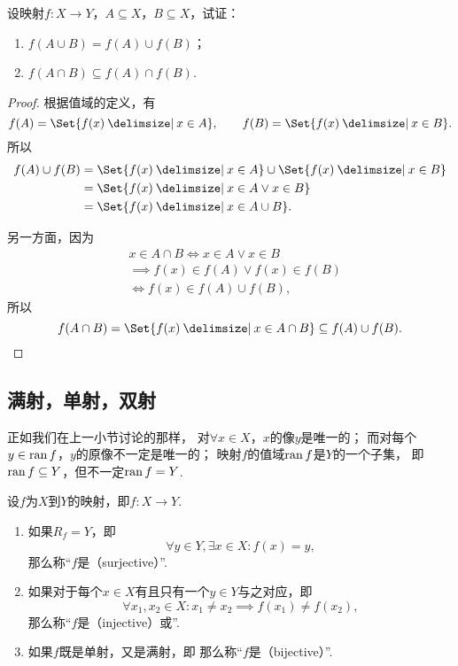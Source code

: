 \begin{example}
设映射\(f\colon X \to Y\)，\(A \subseteq X\)，\(B \subseteq X\)，试证：\begin{enumerate}
	\item \(f(A \cup B) = f(A) \cup f(B)\)；
	\item \(f(A \cap B) \subseteq f(A) \cap f(B)\).
\end{enumerate}
\begin{proof}
\def\fran#1{ \Set{ f(x) \given #1 } }
根据值域的定义，有\[
	f(A) = \fran{x \in A},
	\qquad
	f(B) = \fran{x \in B}.
\]所以\[
	\begin{split}
		f(A) \cup f(B)
		&= \fran{x \in A} \cup \fran{x \in B} \\
		&= \fran{x \in A \lor x \in B} \\
		&= \fran{x \in A \cup B}.
	\end{split}
\]

另一方面，因为\[
	\begin{split}
		&x \in A \cap B
		\iff
		x \in A \lor x \in B \\
		&\implies
		f(x) \in f(A) \lor f(x) \in f(B) \\
		&\iff
		f(x) \in f(A) \cup f(B),
	\end{split}
\]所以\[
	f(A \cap B) = \fran{x \in A \cap B}
	\subseteq f(A) \cup f(B).
	\qedhere
\]
\end{proof}
\end{example}

\subsection{满射，单射，双射}
正如我们在上一小节讨论的那样，
对\(\forall x \in X\)，\(x\)的像\(y\)是唯一的；
而对每个\(y \in \operatorname{ran} f\)，\(y\)的原像不一定是唯一的；
映射\(f\)的值域\(\operatorname{ran} f\)是\(Y\)的一个子集，
即\(\operatorname{ran} f \subseteq Y\)，但不一定\(\operatorname{ran} f = Y\).

\begin{definition}
	设\(f\)为\(X\)到\(Y\)的映射，即\(f\colon X \to Y\).
	\begin{enumerate}
		\item 如果\(R_f = Y\)，即\[
			\forall y \in Y, \exists x \in X:
			f(x) = y,
		\]
		那么称“\(f\)是（surjective）”.

		\item 如果对于每个\(x \in X\)有且只有一个\(y \in Y\)与之对应，即\[
			\forall x_1, x_2 \in X:
			x_1 \neq x_2
			\implies
			f(x_1) \neq f(x_2),
		\]
		那么称“\(f\)是（injective）或”.

		\item 如果\(f\)既是单射，又是满射，即
		那么称“\(f\)是（bijective）”.
	\end{enumerate}
\end{definition}

